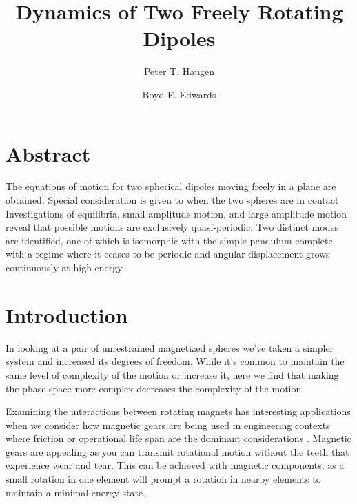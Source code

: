 \documentclass[prbg,preprint]{revtex4-1}
\begin{document}
\title{Dynamics of Two Freely Rotating Dipoles}
\author{Peter T. Haugen}
\author{Boyd F. Edwards}

\maketitle
\section{Abstract}
	The equations of motion for two spherical dipoles moving freely in a plane are obtained. Special consideration is given to when the two spheres are in contact. Investigations of equilibria, small amplitude motion, and large amplitude motion reveal that possible motions are exclusively quasi-periodic.
	Two distinct modes are identified, one of which is isomorphic with the simple pendulum complete with a regime where it ceases to be periodic and angular displacement grows continuously at high energy.
	

\section{Introduction}

In looking at a pair of unrestrained magnetized spheres we've taken a simpler system and increased its degrees of freedom.
While it's common to maintain the same level of complexity of the motion or increase it, here we find that making the phase space more complex decreases the complexity of the motion.

Examining the interactions between rotating magnets has interesting applications when we consider how magnetic gears \cite{doi:10.1119/1.5029823} are being used in engineering contexts where friction or operational life span are the dominant considerations \cite{Modaresahmadi:2019aa}.
Magnetic gears are appealing as you can transmit rotational motion without the teeth that experience wear and tear.
This can be achieved with magnetic components, as a small rotation in one element will prompt a rotation in nearby elements to maintain a minimal energy state.
\end{document}
